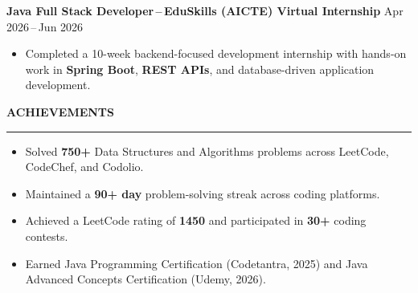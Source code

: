 \documentclass[a4paper]{article}
\newcommand{\sectionrule}[1]{%
    \vspace{2pt}%
    {\color{navy}\large\bfseries #1}\par
    \vspace{2pt}%
    {\color{navy}\rule{\linewidth}{0.70pt}}%
    \vspace{4pt}\par
}
\newcommand{\bullets}{%
    \begin{itemize}[
        leftmargin=1.2em,
        itemsep=1.5pt,
        topsep=1.5pt,
        parsep=0pt,
        partopsep=0pt,
        label={\color{navy}\textbullet}
    ]
}
\begin{document}
\begin{minipage}[t]{135mm}
\begin{minipage}[t]{123mm}
        {\bfseries Java Full Stack Developer\,--\,EduSkills (AICTE) Virtual Internship}%
        \hfill
        {\color{navy}\small Apr 2026\,--\,Jun 2026}\par
        \vspace{2pt}

        \bullets
            \item Completed a 10-week backend-focused development internship with hands-on work in \textbf{Spring Boot}, \textbf{REST APIs}, and database-driven application development.
        \end{itemize}

        \vspace{5pt}

        \sectionrule{ACHIEVEMENTS}

        \bullets
            \item Solved \textbf{750+} Data Structures and Algorithms problems across LeetCode, CodeChef, and Codolio.
            \item Maintained a \textbf{90+ day} problem-solving streak across coding platforms.
            \item Achieved a LeetCode rating of \textbf{1450} and participated in \textbf{30+} coding contests.
            \item Earned Java Programming Certification (Codetantra, 2025) and Java Advanced Concepts Certification (Udemy, 2026).
        \end{itemize}

    \end{minipage}

\end{minipage}
\end{document}
